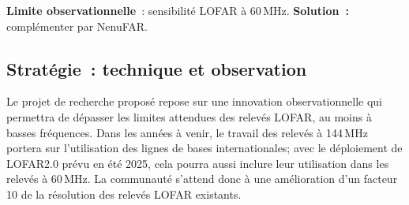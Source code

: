 \begin{tcolorbox}[colback=green!10, colframe=green!50!black, arc=3mm, boxrule=1pt]
	\textbf{Limite observationnelle}~: sensibilit\'e LOFAR \`a 60\,MHz. \textbf{Solution~:} compl\'ementer par NenuFAR. 
\end{tcolorbox}
%
%
%

\subsection{Strat\'egie~: technique et observation}

\pg
Le projet de recherche propos\'e repose sur une innovation observationnelle qui permettra de d\'epasser les limites attendues des relev\'es LOFAR, au moins \`a basses fr\'equences. Dans les ann\'ees \`a venir, le travail des relev\'es \`a 144\,MHz portera sur l'utilisation des lignes de bases internationales; avec le d\'eploiement de LOFAR2.0 pr\'evu en \'et\'e 2025, cela pourra aussi inclure leur utilisation dans les relev\'es \`a 60\,MHz. La communaut\'e s'attend donc \`a une am\'elioration d'un facteur 10 de la r\'esolution des relev\'es LOFAR existants.  


